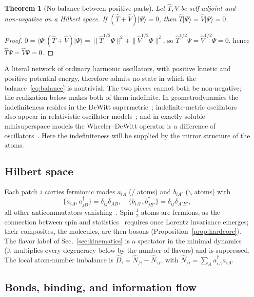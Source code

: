 \documentclass[reprint,aps,prd,amsmath,amssymb,superscriptaddress,nofootinbib,floatfix]{revtex4-2}
\theoremstyle{plain}
\newtheorem{theorem}{Theorem}
\theoremstyle{definition}
\theoremstyle{remark}
\newcommand{\Lat}{\ensuremath{/}}                 %
\newcommand{\Rat}{\ensuremath{\backslash}}        %
\newcommand{\ket}[1]{\ensuremath{|#1\rangle}}
\newcommand{\bra}[1]{\ensuremath{\langle #1|}}
\newcommand{\Tc}{\hat{T}}
\newcommand{\Vc}{\hat{V}}
\begin{document}
\begin{theorem}[No balance between positive parts]
\label{thm:nogo}
Let $\Tc,\Vc$ be self-adjoint and non-negative on a Hilbert space. If $(\Tc+\Vc)\ket\Psi=0$, then
$\Tc\ket\Psi=\Vc\ket\Psi=0$.
\end{theorem}
\begin{proof}
$0=\bra\Psi(\Tc+\Vc)\ket\Psi=\|\Tc^{1/2}\Psi\|^2+\|\Vc^{1/2}\Psi\|^2$, so $\Tc^{1/2}\Psi=\Vc^{1/2}\Psi=0$, hence
$\Tc\Psi=\Vc\Psi=0$.
\end{proof}

A literal network of ordinary harmonic oscillators, with positive kinetic and positive potential
energy, therefore admits no state in which the balance~\eqref{eq:balance} is nontrivial. The two pieces cannot both
be non-negative; the realization below makes both of them indefinite. In geometrodynamics the indefiniteness resides in the DeWitt
supermetric~\cite{DeWitt1967}; indefinite-metric oscillators also appear in relativistic oscillator
models~\cite{FKR1971}; and in exactly soluble minisuperspace models the Wheeler--DeWitt operator is a
difference of oscillators~\cite{Hawking1984,Kiefer2012}. Here the indefiniteness will be supplied by the
mirror structure of the atoms.

\subsection{Hilbert space}

Each patch $i$ carries fermionic modes $a_{iA}$ ($\Lat$ atoms) and $b_{iA'}$ ($\Rat$ atoms) with
\begin{equation}
\{a_{iA},a^\dagger_{jB}\}=\delta_{ij}\delta_{AB},\quad
\{b_{iA'},b^\dagger_{jB'}\}=\delta_{ij}\delta_{A'B'},
\label{eq:car}
\end{equation}
all other anticommutators vanishing~\cite{JordanWigner1928}. Spin-$\tfrac12$ atoms are fermions, as the connection
between spin and statistics~\cite{Pauli1940} requires once Lorentz invariance emerges; their composites, the
molecules, are then bosons (Proposition~\ref{prop:hardcore}). The flavor label of Sec.~\ref{sec:kinematics} is a spectator in the
minimal dynamics (it multiplies every degeneracy below by the number of flavors) and is suppressed.
The local atom-number imbalance is $\hat D_i=\hat N_{\Lat i}-\hat N_{\Rat i}$, with
$\hat N_{\Lat i}=\sum_Aa^\dagger_{iA}a_{iA}$.

\subsection{Bonds, binding, and information flow}
\end{document}
